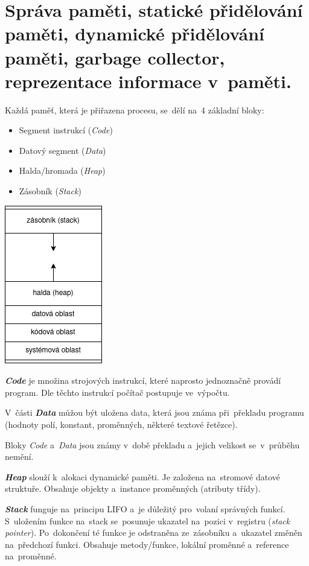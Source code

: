 \section{Správa paměti, statické přidělování paměti, dynamické přidělování paměti, garbage collector, reprezentace informace v~paměti.}

\begin{multicols}{2}
	Každá paměť, která je přiřazena procesu, se~dělí na~4 základní bloky:

	\begin{itemize}
		\item Segment instrukcí (\emph{Code})
		\item Datový segment (\emph{Data})
		\item Halda/hromada (\emph{Heap})
		\item Zásobník (\emph{Stack})
	\end{itemize}

	\centering
	\includegraphics[scale=0.6]{images/pamet.png}
\end{multicols}

\emph{\textbf{Code}} je množina strojových instrukcí, které naprosto jednoznačně provádí program. Dle těchto instrukcí počítač postupuje ve~výpočtu.

V~části \emph{\textbf{Data}} můžou být uložena data, která jsou známa při~překladu programu (hodnoty polí, konstant, proměnných, některé textové řetězce).

Bloky \emph{Code} a~\emph{Data} jsou známy v~době překladu a~jejich velikost se~v~průběhu nemění.

\emph{\textbf{Heap}} slouží k~alokaci dynamické paměti. Je založena na~stromové datové struktuře. Obsahuje objekty a~instance proměnných (atributy třídy).

\emph{\textbf{Stack}} funguje na~principu LIFO a~je důležitý pro~volaní správných funkcí. S~uložením funkce na~stack se~posunuje ukazatel na~pozici v~registru (\emph{stack pointer}). Po~dokončení té funkce je odstraněna ze~zásobníku a~ukazatel změněn na~předchozí funkci. Obsahuje metody/funkce, lokální proměnné a~reference na~proměnné.

